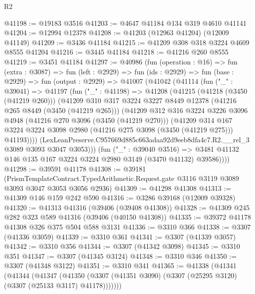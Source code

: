 \begin{lexlean}{R2}
\begin{coremodule}
@41198 := @19183 @3516
@41203 := @4647 @41184 @134 @319 @4610 @41141
@41204 := @12994 @12378
@41208 := @41203 (@12963 @41204) (@12009 @41149)
@41209 := @3436 @41184
@41215 := @41209 @308 @318 @3224 @4609 @8555 @41204
@41216 := @3445 @41184
@41218 := @41216 @260 @8555
@41219 := @3451 @41184
@41297 := @40986
    (fun (operation : @16) =>
    fun (extra : @3087) =>
    fun (left : @2929) =>
    fun (ids : @2929) =>
    fun (base : @2929) =>
    fun (output : @2929) =>
    @41007
      (@41042
        (@41114
          (fun ("_" : @39041) =>
          @41197
            (fun ("_" : @41198) =>
            @41208
              (@41215
                (@41218 (@3450 (@41219 @260)))
                (@41209
                  @310
                  @317
                  @3224
                  @3227
                  @8449
                  @12378
                  (@41216 @265 @8449 (@3450 (@41219 @265)))
                  (@41209
                    @312
                    @316
                    @3224
                    @3226
                    @3096
                    @4948
                    (@41216 @270 @3096 (@3450 (@41219 @270)))
                    (@41209
                      @314
                      @167
                      @3224
                      @3224
                      @3098
                      @2980
                      (@41216 @275 @3098 (@3450 (@41219 @275)))
                      @41193))))
              (LexLeanPreserve.C957669d885c663adaa92d9eeb8dfa4c7.R2.__rel_3
                @3089
                @3093
                @3047
                @3053)))
          (fun ("_" : @39040 @3516) =>
          @3481 @41132 @146 @135 @167 @3224 @3224 @2980 @3149 (@3470 @41132) @39586))))
@41298 := @39591 @41178
@41308 := @39181
    (PrismTemplateContract.TypedArithmetic.Request.gate
      @3116
      @3119
      @3089
      @3093
      @3047
      @3053
      @3056
      @2936)
@41309 := @41298 @41308
@41313 := @41309 @146 @159 @242 @590
@41316 := @3286 @39168 (@12009 @39328)
@41320 := @41313 @41316 (@39406 (@39408 @41308))
@41328 := @41309 @245 @282 @323 @589 @41316 (@39406 (@40150 @41308))
@41335 := @39372 @41178 @41308 @326 @375 @504 @588 @3131
@41336 := @3310 @366
@41338 := @3307 (@41336 @3059)
@41339 := @3310 @361
@41341 := @3307 (@41339 @3057)
@41342 := @3310 @356
@41344 := @3307 (@41342 @3098)
@41345 := @3310 @351
@41347 := @3307 (@41345 @3124)
@41348 := @3310 @346
@41350 := @3307 (@41348 @3122)
@41351 := @3310 @341
@41365 := @41338
    (@41341
      (@41344
        (@41347
          (@41350 (@3307 (@41351 @3090) (@3307 (@25295 @3120) (@3307 (@25133 @3117) @41178)))))))

\end{coremodule}
\end{lexlean}
